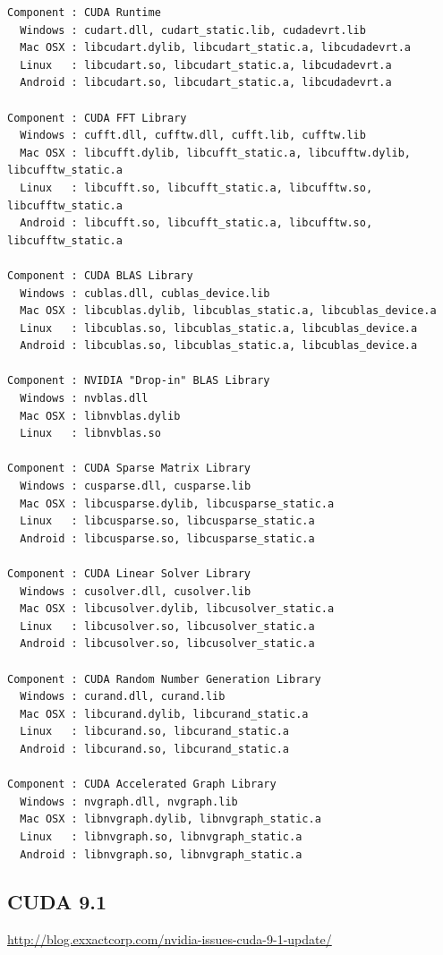 \begin{verbatim}
Component : CUDA Runtime
  Windows : cudart.dll, cudart_static.lib, cudadevrt.lib
  Mac OSX : libcudart.dylib, libcudart_static.a, libcudadevrt.a
  Linux   : libcudart.so, libcudart_static.a, libcudadevrt.a
  Android : libcudart.so, libcudart_static.a, libcudadevrt.a

Component : CUDA FFT Library
  Windows : cufft.dll, cufftw.dll, cufft.lib, cufftw.lib
  Mac OSX : libcufft.dylib, libcufft_static.a, libcufftw.dylib, libcufftw_static.a
  Linux   : libcufft.so, libcufft_static.a, libcufftw.so, libcufftw_static.a
  Android : libcufft.so, libcufft_static.a, libcufftw.so, libcufftw_static.a

Component : CUDA BLAS Library
  Windows : cublas.dll, cublas_device.lib
  Mac OSX : libcublas.dylib, libcublas_static.a, libcublas_device.a
  Linux   : libcublas.so, libcublas_static.a, libcublas_device.a
  Android : libcublas.so, libcublas_static.a, libcublas_device.a

Component : NVIDIA "Drop-in" BLAS Library
  Windows : nvblas.dll
  Mac OSX : libnvblas.dylib
  Linux   : libnvblas.so

Component : CUDA Sparse Matrix Library
  Windows : cusparse.dll, cusparse.lib
  Mac OSX : libcusparse.dylib, libcusparse_static.a
  Linux   : libcusparse.so, libcusparse_static.a
  Android : libcusparse.so, libcusparse_static.a

Component : CUDA Linear Solver Library
  Windows : cusolver.dll, cusolver.lib
  Mac OSX : libcusolver.dylib, libcusolver_static.a
  Linux   : libcusolver.so, libcusolver_static.a
  Android : libcusolver.so, libcusolver_static.a

Component : CUDA Random Number Generation Library
  Windows : curand.dll, curand.lib
  Mac OSX : libcurand.dylib, libcurand_static.a
  Linux   : libcurand.so, libcurand_static.a
  Android : libcurand.so, libcurand_static.a

Component : CUDA Accelerated Graph Library
  Windows : nvgraph.dll, nvgraph.lib
  Mac OSX : libnvgraph.dylib, libnvgraph_static.a
  Linux   : libnvgraph.so, libnvgraph_static.a
  Android : libnvgraph.so, libnvgraph_static.a
\end{verbatim}

\subsection{CUDA 9.1}
\label{sec:CUDA_9.1}

\url{http://blog.exxactcorp.com/nvidia-issues-cuda-9-1-update/}

